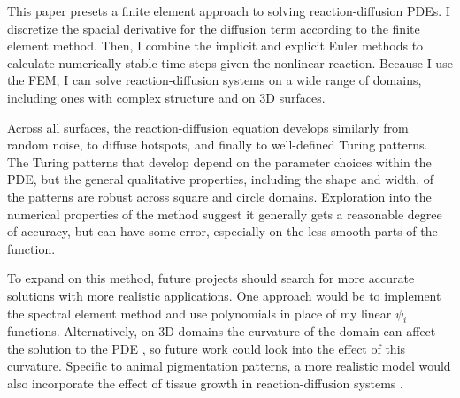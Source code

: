 This paper presets a finite element approach to solving reaction-diffusion PDEs. I discretize the spacial derivative for the diffusion term according to the finite element method. Then, I combine the implicit and explicit Euler methods to calculate numerically stable time steps given the nonlinear reaction. Because I use the FEM, I can solve reaction-diffusion systems on a wide range of domains, including ones with complex structure and on 3D surfaces.

Across all surfaces, the reaction-diffusion equation develops similarly from random noise, to diffuse hotspots, and finally to well-defined Turing patterns. The Turing patterns that develop depend on the parameter choices within the PDE, but the general qualitative properties, including the shape and width, of the patterns are robust across square and circle domains. Exploration into the numerical properties of the method suggest it generally gets a reasonable degree of accuracy, but can have some error, especially on the less smooth parts of the function.

To expand on this method, future projects should search for more accurate solutions with more realistic applications. One approach would be to implement the spectral element method \parencite{hafeez2023review} and use polynomials in place of my linear $\psi_i$ functions. Alternatively, on 3D domains the curvature of the domain can affect the solution to the PDE \parencites{staddon2024zebra}{leon2021full}, so future work could look into the effect of this curvature. Specific to animal pigmentation patterns, a more realistic model would also incorporate the effect of tissue growth in reaction-diffusion systems \parencite{de2020leopard}.
